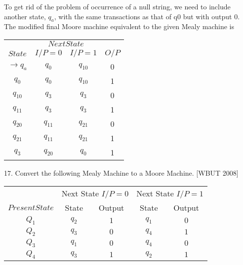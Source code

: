 \documentclass{article}
\begin{document}
\vspace*{0.3cm}


To get rid of the problem of occurrence of a null string, we need to include another state, $q_a$, with
the same transactions as that of q0 but with output 0.\\
\hspace*{0.5cm} The modified final Moore machine equivalent to the given Mealy machine is\\

\begin{center}
\begin{tabular}{cccc}
 \hline

 \hline

 \hline

 \hline
 & \multicolumn{2}{c}{$Next State$}\\
 \cline{2-3}
 $State$ &  $I/P=0$ & $I/P=1$  &  $O/P$\\
\hline
$\rightarrow q_a$ & $q_0$  & $q_10$  & 0\\
$q_0$ & $q_0$ & $q_10$ &1\\
$q_10$ & $q_3$ & $q_3$ &0\\
$q_11$ & $q_3$ & $q_3$ &1\\
$q_20$ & $q_11$ & $q_21$ &0\\
$q_21$ & $q_11$ & $q_21$ &1\\
$q_3$  & $q_20$ & $q_0$ &1\\
 \hline

 \hline

 \hline

 \hline
\end{tabular}
\end{center}

\vspace*{0.3cm}

17. Convert the following Mealy Machine to a Moore Machine.  \hspace*{0.5cm} [WBUT 2008]\\

\vspace*{0.3cm}
\begin{center}
\begin{tabular}{ccccc}
 \hline

 \hline

 \hline

 \hline
 &  \multicolumn{2}{c}{ Next State   $I/P = 0$ } &  \multicolumn{2}{c}{ Next State   $ I/P = 1$}  \\
  \cline{2-3}                         \cline{4-5}
 $Present State$ &State & Output &  State & Output\\
\hline
$Q_1$   &  $q_2$  &  $1$  &  $q_1$  & $0$ \\
$Q_2$   &  $q_3$  &  $0$  &  $q_4$  & $1$ \\
$Q_3$   &  $q_1$  &  $0$  &  $q_4$  & $0$ \\
$Q_4$   &  $q_3$  &  $1$  &  $q_2$  & $1$ \\
 \hline

 \hline

 \hline

 \hline
\end{tabular}
\end{center}
\end{document}

